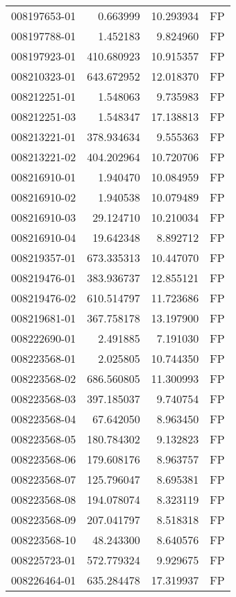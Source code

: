 \begin{tabular}{lrrl}
008197653-01 &    0.663999 &    10.293934 &   FP \\
008197788-01 &    1.452183 &     9.824960 &   FP \\
008197923-01 &  410.680923 &    10.915357 &   FP \\
008210323-01 &  643.672952 &    12.018370 &   FP \\
008212251-01 &    1.548063 &     9.735983 &   FP \\
008212251-03 &    1.548347 &    17.138813 &   FP \\
008213221-01 &  378.934634 &     9.555363 &   FP \\
008213221-02 &  404.202964 &    10.720706 &   FP \\
008216910-01 &    1.940470 &    10.084959 &   FP \\
008216910-02 &    1.940538 &    10.079489 &   FP \\
008216910-03 &   29.124710 &    10.210034 &   FP \\
008216910-04 &   19.642348 &     8.892712 &   FP \\
008219357-01 &  673.335313 &    10.447070 &   FP \\
008219476-01 &  383.936737 &    12.855121 &   FP \\
008219476-02 &  610.514797 &    11.723686 &   FP \\
008219681-01 &  367.758178 &    13.197900 &   FP \\
008222690-01 &    2.491885 &     7.191030 &   FP \\
008223568-01 &    2.025805 &    10.744350 &   FP \\
008223568-02 &  686.560805 &    11.300993 &   FP \\
008223568-03 &  397.185037 &     9.740754 &   FP \\
008223568-04 &   67.642050 &     8.963450 &   FP \\
008223568-05 &  180.784302 &     9.132823 &   FP \\
008223568-06 &  179.608176 &     8.963757 &   FP \\
008223568-07 &  125.796047 &     8.695381 &   FP \\
008223568-08 &  194.078074 &     8.323119 &   FP \\
008223568-09 &  207.041797 &     8.518318 &   FP \\
008223568-10 &   48.243300 &     8.640576 &   FP \\
008225723-01 &  572.779324 &     9.929675 &   FP \\
008226464-01 &  635.284478 &    17.319937 &   FP \\

\end{tabular}
